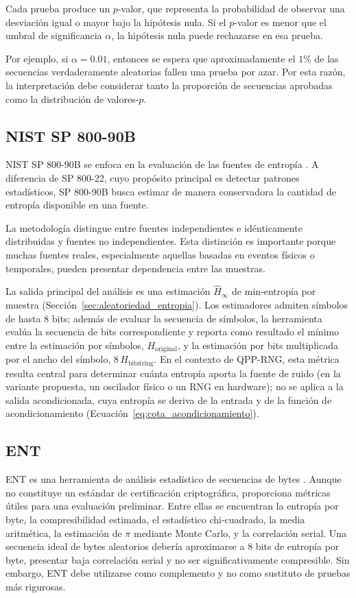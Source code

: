 Cada prueba produce un $p$-valor, que representa la probabilidad de observar una desviación igual o mayor bajo la hipótesis nula. Si el $p$-valor es menor que el umbral de significancia $\alpha$, la hipótesis nula puede rechazarse en esa prueba.

Por ejemplo, si $\alpha = 0.01$, entonces se espera que aproximadamente el $1\%$ de las secuencias verdaderamente aleatorias fallen una prueba por azar. Por esta razón, la interpretación debe considerar tanto la proporción de secuencias aprobadas como la distribución de valores-$p$.

\subsection{NIST SP 800-90B}

NIST SP 800-90B se enfoca en la evaluación de las fuentes de entropía \cite{Turan2018RecommendationGeneration}. A diferencia de SP 800-22, cuyo propósito principal es detectar patrones estadísticos, SP 800-90B busca estimar de manera conservadora la cantidad de entropía disponible en una fuente.

La metodología distingue entre fuentes independientes e idénticamente distribuidas y fuentes no independientes. Esta distinción es importante porque muchas fuentes reales, especialmente aquellas basadas en eventos físicos o temporales, pueden presentar dependencia entre las muestras.

La salida principal del análisis es una estimación $\hat{H}_\infty$ de min-entropía por muestra (Sección~\ref{sec:aleatoriedad_entropia}). Los estimadores admiten símbolos de hasta 8 bits; además de evaluar la secuencia de símbolos, la herramienta evalúa la secuencia de bits correspondiente y reporta como resultado el mínimo entre la estimación por símbolos, $H_{\text{original}}$, y la estimación por bits multiplicada por el ancho del símbolo, $8\,H_{\text{bitstring}}$. En el contexto de QPP-RNG, esta métrica resulta central para determinar cuánta entropía aporta la fuente de ruido (en la variante propuesta, un oscilador físico o un RNG en hardware); no se aplica a la salida acondicionada, cuya entropía se deriva de la entrada y de la función de acondicionamiento (Ecuación~\eqref{eq:cota_acondicionamiento}).

\subsection{ENT}

ENT es una herramienta de análisis estadístico de secuencias de bytes \cite{Walker2008ENT:Program}. Aunque no constituye un estándar de certificación criptográfica, proporciona métricas útiles para una evaluación preliminar. Entre ellas se encuentran la entropía por byte, la compresibilidad estimada, el estadístico chi-cuadrado, la media aritmética, la estimación de $\pi$ mediante Monte Carlo, y la correlación serial.
Una secuencia ideal de bytes aleatorios debería aproximarse a $8$ bits de entropía por byte, presentar baja correlación serial y no ser significativamente compresible. Sin embargo, ENT debe utilizarse como complemento y no como sustituto de pruebas más rigurosas.

